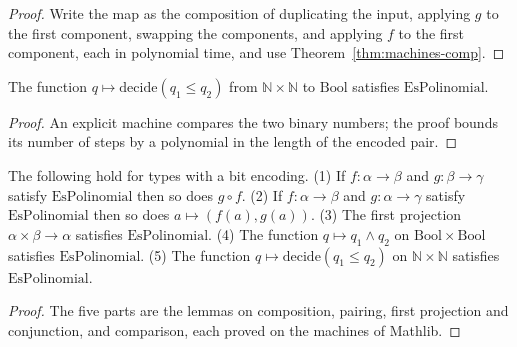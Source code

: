 \begin{proof}
  \leanok
  Write the map as the composition of duplicating the input, applying $g$ to the first component, swapping
  the components, and applying $f$ to the first component, each in polynomial time, and use
  Theorem~\ref{thm:machines-comp}.
\end{proof}

\begin{theorem}
  \label{thm:machines-le}
  \leanok
  The function $q \mapsto \mathrm{decide}(q_1 \le q_2)$ from $\mathbb{N} \times \mathbb{N}$ to
  $\mathrm{Bool}$ satisfies $\mathrm{EsPolinomial}$.
  \own{}
  \infrastructure{}
\end{theorem}

\begin{proof}
  \leanok
  An explicit machine compares the two binary numbers; the proof bounds its number of steps by a polynomial
  in the length of the encoded pair.
\end{proof}

\begin{theorem}
  \label{thm:machines-closure}
  \leanok
  The following hold for types with a bit encoding. (1) If $f : \alpha \to \beta$ and $g : \beta \to \gamma$
  satisfy $\mathrm{EsPolinomial}$ then so does $g \circ f$. (2) If $f : \alpha \to \beta$ and
  $g : \alpha \to \gamma$ satisfy $\mathrm{EsPolinomial}$ then so does $a \mapsto (f(a), g(a))$. (3) The first
  projection $\alpha \times \beta \to \alpha$ satisfies $\mathrm{EsPolinomial}$. (4) The function
  $q \mapsto q_1 \wedge q_2$ on $\mathrm{Bool} \times \mathrm{Bool}$ satisfies $\mathrm{EsPolinomial}$.
  (5) The function $q \mapsto \mathrm{decide}(q_1 \le q_2)$ on $\mathbb{N} \times \mathbb{N}$ satisfies
  $\mathrm{EsPolinomial}$.
  \own{}
  \infrastructure{}
\end{theorem}

\begin{proof}
  \leanok
  The five parts are the lemmas on composition, pairing, first projection and conjunction, and comparison,
  each proved on the machines of Mathlib.
\end{proof}

